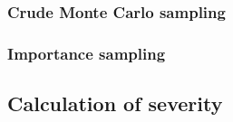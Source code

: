 \subsubsection{Crude Monte Carlo sampling}
\label{sec:cmc}



\subsubsection{Importance sampling}
\label{sec:is}



\subsection{Calculation of severity}
\label{sec:severity}
